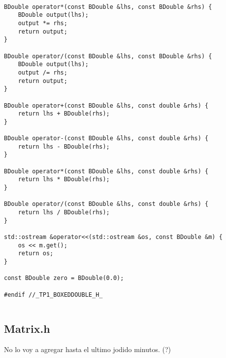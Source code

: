 \begin{codesnippet}
\begin{verbatim}

BDouble operator*(const BDouble &lhs, const BDouble &rhs) {
    BDouble output(lhs);
    output *= rhs;
    return output;
}

BDouble operator/(const BDouble &lhs, const BDouble &rhs) {
    BDouble output(lhs);
    output /= rhs;
    return output;
}

BDouble operator+(const BDouble &lhs, const double &rhs) {
    return lhs + BDouble(rhs);
}

BDouble operator-(const BDouble &lhs, const double &rhs) {
    return lhs - BDouble(rhs);
}

BDouble operator*(const BDouble &lhs, const double &rhs) {
    return lhs * BDouble(rhs);
}

BDouble operator/(const BDouble &lhs, const double &rhs) {
    return lhs / BDouble(rhs);
}

std::ostream &operator<<(std::ostream &os, const BDouble &m) {
    os << m.get();
    return os;
}

const BDouble zero = BDouble(0.0);

#endif //_TP1_BOXEDDOUBLE_H_


\end{verbatim}
\end{codesnippet}

\subsection{Matrix.h}

No lo voy a agregar hasta el ultimo jodido minutos. (?)
